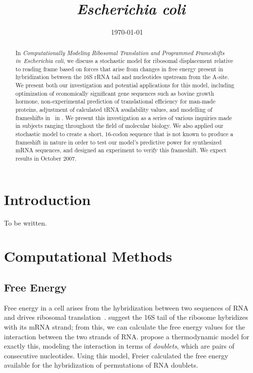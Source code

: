 \documentclass[12pt]{article}
\author{\sc{\BWFauthors}}
\date{{\sc \today}}
\title{\bf{\BWFtitle\ \emph{Escherichia coli}}}
\newcommand{\BWFtitle}{Computationally
  Modeling Ribosomal Translation and Programmed Frameshifts in}
\numberwithin{equation}{section}
\begin{document}
\begin{singlespace}
  \maketitle
  \tableofcontents
\end{singlespace}

\clearpage
\begin{abstract}\begin{normalsize}
  In \emph{\BWFtitle\ Escherichia coli}, we discuss a stochastic model for ribosomal displacement relative to reading 
  frame based on forces that arise from changes in free energy present in hybridization between the 
  16S rRNA tail and nucleotides upstream from the A-site.  We present both our investigation and 
  potential applications for this model, including optimization of economically significant gene
  sequences such as bovine growth hormone, non-experimental prediction of translational efficiency for man-made 
  proteins, adjustment of calculated tRNA availability values, and modelling of frameshifts in \prfB\ in \ecoli.
  We present this investigation as a series of various inquiries made 
  in subjects ranging throughout the field of molecular biology.  We also applied our stochastic 
  model to create a short, 16-codon sequence that is not known to produce a frameshift in nature 
  in order to test our model's predictive power for synthesized mRNA sequences, and designed an 
  experiment to verify this frameshift.  We expect results in October 2007.
\end{normalsize}\end{abstract}
\clearpage
{}

\section{Introduction}
To be written.

\section{Computational Methods}
\subsection{Free Energy}
\label{freeenergy}

Free energy in a cell arises from the hybridization between two
sequences of RNA and drives ribosomal translation~\cite{starmer}.
\citet{weiss88} suggest the 16S tail of the ribosome hybridizes with its mRNA strand;
from this, we can calculate the free energy values for the interaction between the two strands of RNA.
\citet{freier} propose a thermodynamic model for exactly this,
modeling the interaction in terms of \emph{doublets}, which are pairs of consecutive nucleotides.
Using this model, Freier calculated the free energy available
for the hybridization of permutations of RNA doublets.
\end{document}
